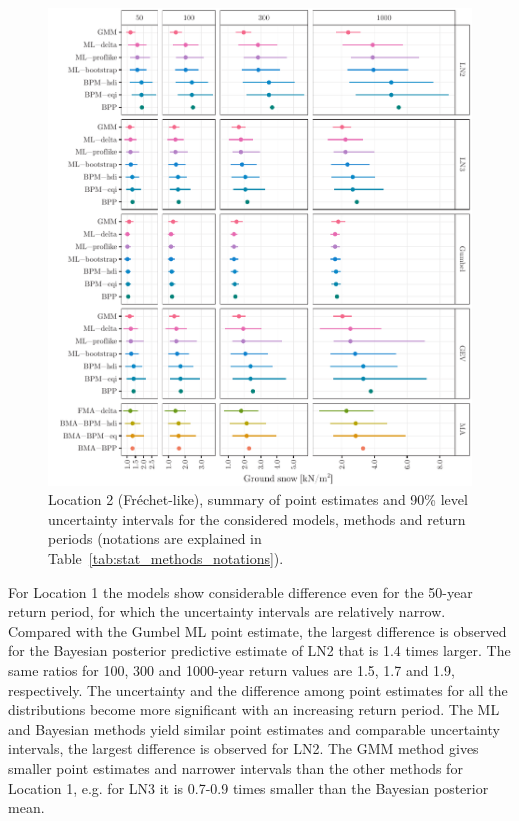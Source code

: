\begin{figure}[htbp!]
	\centering    
	\includegraphics[]{ID2735_full_summary_large.pdf}
	\caption{Location 2 (Fréchet-like), summary of point estimates and 90\% level uncertainty intervals for the considered models, methods and return periods (notations are explained in Table~\ref{tab:stat_methods_notations}).}
	\label{fig:loc2_full_summary}
\end{figure}

For Location 1 the models show considerable difference even for the 50-year return period, for which the uncertainty intervals are relatively narrow. Compared with the Gumbel ML point estimate, the largest difference is observed for the Bayesian posterior predictive estimate of LN2 that is 1.4 times larger. The same ratios for 100, 300 and 1000-year return values are 1.5, 1.7 and 1.9, respectively. The uncertainty and the difference among point estimates for all the distributions become more significant with an increasing return period. The ML and Bayesian methods yield similar point estimates and comparable uncertainty intervals, the largest difference is observed for LN2. The GMM method gives smaller point estimates and narrower intervals than the other methods for Location 1, e.g. for LN3 it is 0.7-0.9 times smaller than the Bayesian posterior mean.

